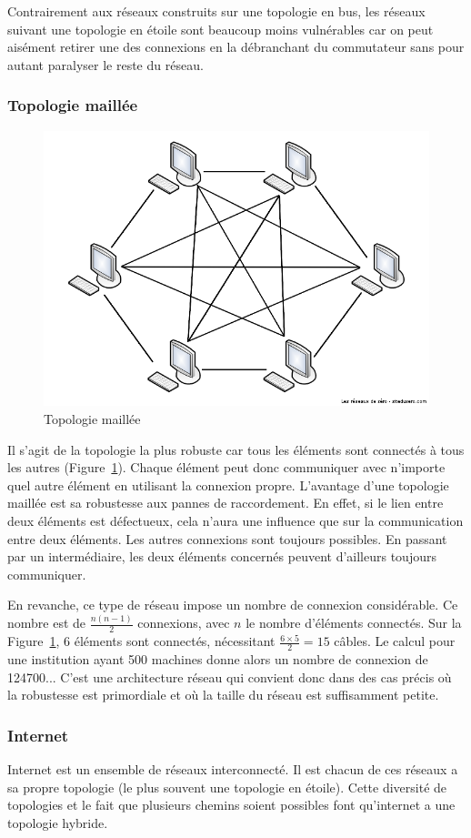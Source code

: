 Contrairement aux réseaux construits sur une topologie en bus, les réseaux suivant une topologie en étoile sont beaucoup moins vulnérables car on peut aisément retirer une des connexions en la débranchant du commutateur sans pour autant paralyser le reste du réseau.

\subsubsection{Topologie maillée}
\begin{figure}[h!]
  \centering
  \includegraphics[width=.4\textwidth]{images/topologies/topologieMaillee}
  \caption{Topologie maillée}
  \label{fig:topoMaillee}
\end{figure}

Il s'agit de la topologie la plus robuste car tous les éléments sont connectés à tous les autres (Figure~\ref{fig:topoMaillee}). Chaque élément peut donc communiquer avec n'importe quel autre élément en utilisant la connexion propre. L'avantage d'une topologie maillée est sa robustesse aux pannes de raccordement. En effet, si le lien entre deux éléments est défectueux, cela n'aura une influence que sur la communication entre deux éléments. Les autres connexions sont toujours possibles. En passant par un intermédiaire, les deux éléments concernés peuvent d'ailleurs toujours communiquer.

En revanche, ce type de réseau impose un nombre de connexion considérable. Ce nombre est de $\frac{n(n-1)}{2}$ connexions, avec $n$ le nombre d'éléments connectés. Sur la Figure~\ref{fig:topoMaillee}, 6 éléments sont connectés, nécessitant $\frac{6 \times 5}{2} = 15$ câbles. Le calcul pour une institution ayant 500 machines donne alors un nombre de connexion de \num{124700}... C'est une architecture réseau qui convient donc dans des cas précis où la robustesse est primordiale et où la taille du réseau est suffisamment petite.

\subsubsection{Internet}

Internet est un ensemble de réseaux interconnecté. Il est chacun de ces réseaux a sa propre topologie (le plus souvent une topologie en étoile). Cette diversité de topologies et le fait que plusieurs chemins soient possibles font qu'internet a une topologie hybride.
